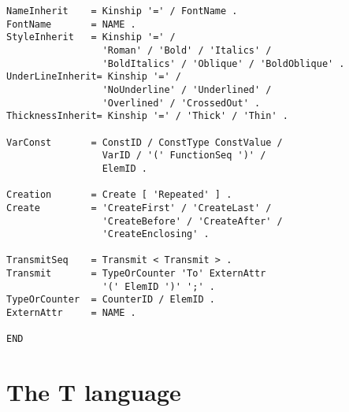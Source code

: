 \begin{verbatim}
NameInherit    = Kinship '=' / FontName .
FontName       = NAME .
StyleInherit   = Kinship '=' /
                 'Roman' / 'Bold' / 'Italics' / 
                 'BoldItalics' / 'Oblique' / 'BoldOblique' .
UnderLineInherit= Kinship '=' /
                 'NoUnderline' / 'Underlined' / 
                 'Overlined' / 'CrossedOut' .
ThicknessInherit= Kinship '=' / 'Thick' / 'Thin' .

VarConst       = ConstID / ConstType ConstValue /
                 VarID / '(' FunctionSeq ')' /
                 ElemID .

Creation       = Create [ 'Repeated' ] .
Create         = 'CreateFirst' / 'CreateLast' /
                 'CreateBefore' / 'CreateAfter' /
                 'CreateEnclosing' .

TransmitSeq    = Transmit < Transmit > .
Transmit       = TypeOrCounter 'To' ExternAttr
                 '(' ElemID ')' ';' .
TypeOrCounter  = CounterID / ElemID .
ExternAttr     = NAME .

END
\end{verbatim}

\section{The T language}

